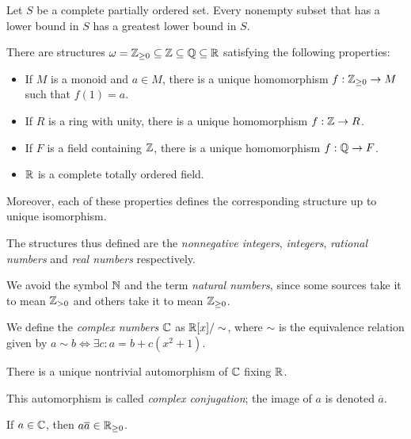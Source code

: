   \begin{prop}
    Let $S$ be a complete partially ordered set. Every nonempty subset that
    has a lower bound in $S$ has a greatest lower bound in $S$.
  \end{prop}
  \begin{thm}
      There are structures $\omega=\mathbb{Z}_{\ge
      0}\subseteq\mathbb{Z}\subseteq\mathbb{Q}\subseteq\mathbb{R}$ satisfying the
      following properties:
      \begin{itemize}
          \item If $M$ is a monoid and $a\in M$, there is a unique homomorphism
              $f:\mathbb{Z}_{\ge 0}\to M$ such that $f(1)=a$.
          \item If $R$ is a ring with unity, there is a unique homomorphism
              $f:\mathbb{Z}\to R$.
          \item If $F$ is a field containing $\mathbb{Z}$, there is a unique homomorphism $f:\mathbb{Q}\to F$.
          \item $\mathbb{R}$ is a complete totally ordered field.
      \end{itemize}
      Moreover, each of these properties defines the corresponding structure up to unique isomorphism.
  \end{thm}
  \begin{defn}
      The structures thus defined are the \emph{nonnegative integers},
      \emph{integers}, \emph{rational numbers} and \emph{real numbers}
      respectively.
  \end{defn}
  \begin{rem}
      We avoid the symbol $\mathbb{N}$ and the term \emph{natural numbers},
      since some sources take it to mean $\mathbb{Z}_{>0}$ and others take it to mean
      $\mathbb{Z}_{\ge 0}$.
  \end{rem}
  \begin{defn}
      We define the \emph{complex numbers} $\mathbb{C}$ as $\mathbb{R}[x]/\sim$, where $\sim$
      is the equivalence relation given by $a\sim b\iff\exists c:a=b+c(x^2+1)$.
  \end{defn}
  \begin{prop}
      There is a unique nontrivial automorphism of $\mathbb{C}$ fixing $\mathbb{R}$.
  \end{prop}
  \begin{defn}
      This automorphism is called \emph{complex conjugation}; the image of $a$
      is denoted $\overline a$.
  \end{defn}
  \begin{prop}
      If $a\in\mathbb{C}$, then $a\overline a\in\mathbb{R}_{\ge 0}$.
  \end{prop}
